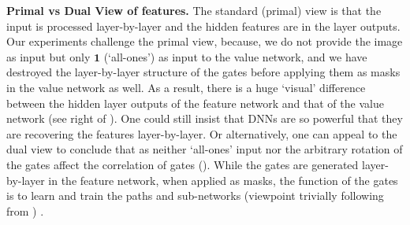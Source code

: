 
\textbf{Primal vs Dual View of features.} The standard (primal) view is that the input is processed layer-by-layer and the hidden features are in the layer outputs. 
Our experiments challenge the primal view, because, 
we do not provide the image as input but only $\mathbf{1}$ (`all-ones') as input to the value network, and we have destroyed the layer-by-layer structure of the gates before applying them as masks in the value network as well.  As a result, there is a huge `visual' difference between the hidden layer outputs of the feature network and that of the value network (see right of ).  One could still insist that DNNs are so powerful that they are recovering the features layer-by-layer. Or alternatively, one can appeal to the dual view to conclude that as neither `all-ones' input nor the arbitrary rotation of the gates affect the correlation of gates (). While the gates are generated layer-by-layer in the feature network, when applied as masks, the function of the gates is to learn and train the paths and sub-networks (viewpoint trivially following from ) .

